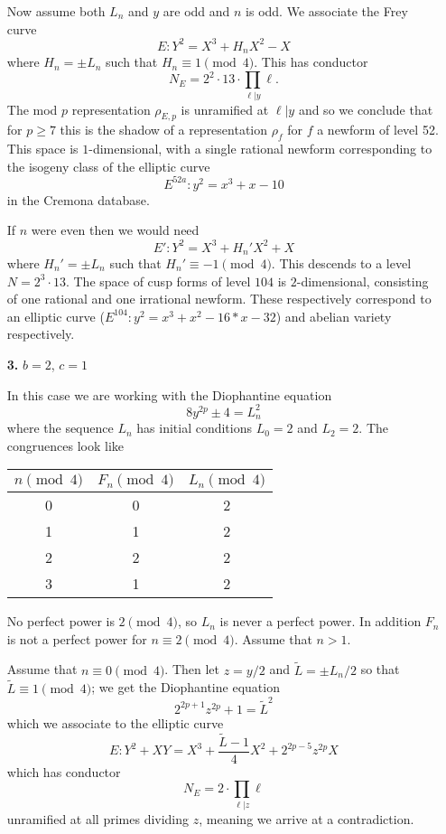 \documentclass[12pt]{article}
\begin{document}
\begin{enumerate}
Now assume both $L_n$ and $y$ are odd and $n$ is odd.  We associate the Frey curve
\[ E: Y^2 = X^3 + H_nX^2 - X \]
where $H_n = \pm L_n$ such that $H_n \equiv 1 \pmod{4}$.  
This has conductor
\[ N_E = 2^2 \cdot 13 \cdot \prod_{\ell | y} \ell. \]
The mod $p$ representation $\rho_{E,p}$ is unramified at $\ell | y$ and so we conclude that for $p \geq 7$ this is the shadow of a representation $\rho_f$ for $f$ a newform of level 52.  This space is $1$-dimensional, with a single rational newform corresponding to the isogeny class of the elliptic curve
\[ E^{52a}: y^2 = x^3 + x - 10\]
in the Cremona database.

If $n$ were even then we would need
\[ E': Y^2 = X^3 + H_n'X^2 + X \]
where $H_n' = \pm L_n$ such that $H_n' \equiv -1 \pmod{4}$.  This descends to a level $N = 2^3 \cdot 13$.  The space of cusp forms of level $104$ is $2$-dimensional, consisting of one rational and one irrational newform.  These respectively correspond to an elliptic curve ($E^{104}: y^2 = x^3 + x^2 - 16*x - 32$) and abelian variety respectively.



\item[\textbf{3.}] $b = 2$, $c = 1$

In this case we are working with the Diophantine equation
\[ 8y^{2p} \pm 4 = L_n^2 \]
where the sequence $L_n$ has initial conditions $L_0 = 2$ and $L_2 = 2$.  The congruences look like
\begin{center}
\begin{tabular}{c| c c}
$n \pmod{4}$ & $F_n \pmod{4}$ & $L_n \pmod{4}$ \\ \hline \hline
0 & 0 & 2 \\
1 & 1 &  2 \\
2 & 2 & 2\\
3 & 1 & 2 \\ \hline \hline
\end{tabular}
\end{center}

No perfect power is $2 \pmod{4}$, so $L_n$ is never a perfect power.  In addition $F_n$ is not a perfect power for $n \equiv 2 \pmod{4}$.  Assume that $n > 1$.

Assume that $n \equiv 0 \pmod{4}$.  Then let $z = y/2$ and $\tilde{L} = \pm L_n/2$ so that $\tilde{L} \equiv 1 \pmod{4}$; we get the Diophantine equation
\[ 2^{2p+1}z^{2p} + 1 = \tilde{L}^2 \]
which we associate to the elliptic curve
\[ E: Y^2 +XY = X^3 + \frac{\tilde{L}-1}{4} X^2 + 2^{2p-5}z^{2p}X \]
which has conductor 
\[N_E = 2 \cdot \prod_{\ell | z} \ell \]
unramified at all primes dividing $z$, meaning we arrive at a contradiction.  


\end{enumerate}
\end{document}
